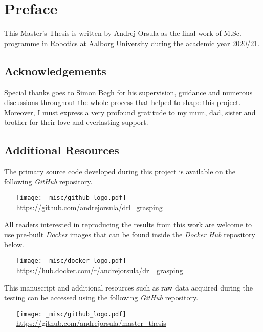 \chapter*{Preface}

This Master’s Thesis is written by Andrej Orsula as the final work of M.Sc. programme in Robotics at Aalborg University during the academic year 2020/21.


\section*{Acknowledgements}

Special thanks goes to Simon Bøgh for his supervision, guidance and numerous discussions throughout the whole process that helped to shape this project.
Moreover, I must express a very profound gratitude to my mum, dad, sister and brother for their love and everlasting support.


\section*{Additional Resources}


\noindent
The primary source code developed during this project is available on the following \textit{GitHub} repository.
\begin{itemize}
    \item[{\texttt{[image: \_misc/github\_logo.pdf]}}] \href{https://github.com/andrejorsula/drl_grasping}{https://github.com/andrejorsula/drl\_grasping}
\end{itemize}

\noindent
All readers interested in reproducing the results from this work are welcome to use pre-built \textit{Docker} images that can be found inside the \textit{Docker Hub} repository below.
\begin{itemize}
    \item[{\texttt{[image: \_misc/docker\_logo.pdf]}}] \href{https://hub.docker.com/r/andrejorsula/drl\_grasping}{https://hub.docker.com/r/andrejorsula/drl\_grasping}
\end{itemize}

\noindent
This manuscript and additional resources such as raw data acquired during the testing can be accessed using the following \textit{GitHub} repository.
\begin{itemize}
    \item[{\texttt{[image: \_misc/github\_logo.pdf]}}] \href{https://github.com/andrejorsula/master_thesis}{https://github.com/andrejorsula/master\_thesis}
\end{itemize}
